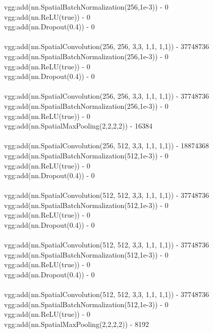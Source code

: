 \documentclass[11pt]{article}
\begin{document}
vgg:add(nn.SpatialBatchNormalization(256,1e-3)) - 0 \\
vgg:add(nn.ReLU(true)) - 0 \\
vgg:add(nn.Dropout(0.4)) - 0 \\
\\
vgg:add(nn.SpatialConvolution(256, 256, 3,3, 1,1, 1,1)) - 37748736 \\
vgg:add(nn.SpatialBatchNormalization(256,1e-3)) - 0 \\
vgg:add(nn.ReLU(true)) - 0 \\
vgg:add(nn.Dropout(0.4)) - 0 \\
\\
vgg:add(nn.SpatialConvolution(256, 256, 3,3, 1,1, 1,1)) - 37748736 \\
vgg:add(nn.SpatialBatchNormalization(256,1e-3)) - 0 \\
vgg:add(nn.ReLU(true)) - 0 \\
vgg:add(nn.SpatialMaxPooling(2,2,2,2)) - 16384 \\
\\
vgg:add(nn.SpatialConvolution(256, 512, 3,3, 1,1, 1,1)) - 18874368 \\
vgg:add(nn.SpatialBatchNormalization(512,1e-3)) - 0 \\
vgg:add(nn.ReLU(true)) - 0 \\
vgg:add(nn.Dropout(0.4)) - 0 \\
\\
vgg:add(nn.SpatialConvolution(512, 512, 3,3, 1,1, 1,1)) - 37748736 \\
vgg:add(nn.SpatialBatchNormalization(512,1e-3)) - 0 \\
vgg:add(nn.ReLU(true)) - 0 \\
vgg:add(nn.Dropout(0.4)) - 0 \\
\\
vgg:add(nn.SpatialConvolution(512, 512, 3,3, 1,1, 1,1)) - 37748736 \\
vgg:add(nn.SpatialBatchNormalization(512,1e-3)) - 0 \\
vgg:add(nn.ReLU(true)) - 0 \\
vgg:add(nn.Dropout(0.4)) - 0 \\
\\
vgg:add(nn.SpatialConvolution(512, 512, 3,3, 1,1, 1,1)) - 37748736 \\
vgg:add(nn.SpatialBatchNormalization(512,1e-3)) - 0 \\
vgg:add(nn.ReLU(true)) - 0 \\
vgg:add(nn.SpatialMaxPooling(2,2,2,2)) - 8192 \\
\end{document}
